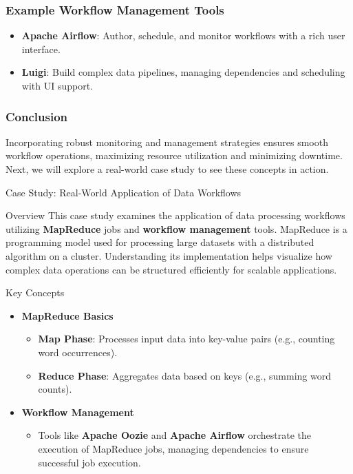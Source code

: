 \documentclass[aspectratio=169]{beamer}
\begin{document}
\begin{frame}[fragile]
    \frametitle{Example Workflow Management Tools}
    \begin{itemize}
        \item \textbf{Apache Airflow}: Author, schedule, and monitor workflows with a rich user interface.
        \item \textbf{Luigi}: Build complex data pipelines, managing dependencies and scheduling with UI support.
    \end{itemize}
\end{frame}

\begin{frame}[fragile]
    \frametitle{Conclusion}
    Incorporating robust monitoring and management strategies ensures smooth workflow operations, maximizing resource utilization and minimizing downtime. Next, we will explore a real-world case study to see these concepts in action.
\end{frame}

\begin{frame}{Case Study: Real-World Application of Data Workflows}
    \begin{block}{Overview}
        This case study examines the application of data processing workflows utilizing \textbf{MapReduce} jobs and \textbf{workflow management} tools.
        MapReduce is a programming model used for processing large datasets with a distributed algorithm on a cluster.
        Understanding its implementation helps visualize how complex data operations can be structured efficiently for scalable applications.
    \end{block}
\end{frame}

\begin{frame}{Key Concepts}
    \begin{itemize}
        \item \textbf{MapReduce Basics}
        \begin{itemize}
            \item \textbf{Map Phase}: Processes input data into key-value pairs (e.g., counting word occurrences).
            \item \textbf{Reduce Phase}: Aggregates data based on keys (e.g., summing word counts).
        \end{itemize}
        
        \item \textbf{Workflow Management}
        \begin{itemize}
            \item Tools like \textbf{Apache Oozie} and \textbf{Apache Airflow} orchestrate the execution of MapReduce jobs, managing dependencies to ensure successful job execution.
        \end{itemize}
    \end{itemize}
\end{frame}
\end{document}
